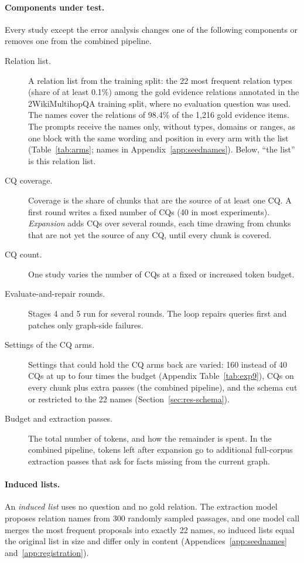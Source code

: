 \paragraph{Components under test.}
Every study except the error analysis changes one of the following components or removes one from the combined pipeline.
\begin{description}
  \item[Relation list.] A relation list from the training split: the 22 most frequent relation types (share of at least 0.1\%) among the gold evidence relations annotated in the 2WikiMultihopQA training split, where no evaluation question was used. The names cover the relations of 98.4\% of the 1,216 gold evidence items. The prompts receive the names only, without types, domains or ranges, as one block with the same wording and position in every arm with the list (Table~\ref{tab:arms}; names in Appendix~\ref{app:seednames}). Below, ``the list'' is this relation list.
  \item[CQ coverage.] Coverage is the share of chunks that are the source of at least one CQ. A first round writes a fixed number of CQs (40 in most experiments). \emph{Expansion} adds CQs over several rounds, each time drawing from chunks that are not yet the source of any CQ, until every chunk is covered.
  \item[CQ count.] One study varies the number of CQs at a fixed or increased token budget.
  \item[Evaluate-and-repair rounds.] Stages 4 and 5 run for several rounds. The loop repairs queries first and patches only graph-side failures.
  \item[Settings of the CQ arms.] Settings that could hold the CQ arms back are varied: 160 instead of 40 CQs at up to four times the budget (Appendix Table~\ref{tab:exp9}), CQs on every chunk plus extra passes (the combined pipeline), and the schema cut or restricted to the 22 names (Section~\ref{sec:res-schema}).
  \item[Budget and extraction passes.] The total number of tokens, and how the remainder is spent. In the combined pipeline, tokens left after expansion go to additional full-corpus extraction passes that ask for facts missing from the current graph.
\end{description}

\paragraph{Induced lists.}
An \emph{induced list} uses no question and no gold relation. The extraction model proposes relation names from 300 randomly sampled passages, and one model call merges the most frequent proposals into exactly 22 names, so induced lists equal the original list in size and differ only in content (Appendices~\ref{app:seednames} and~\ref{app:registration}).

